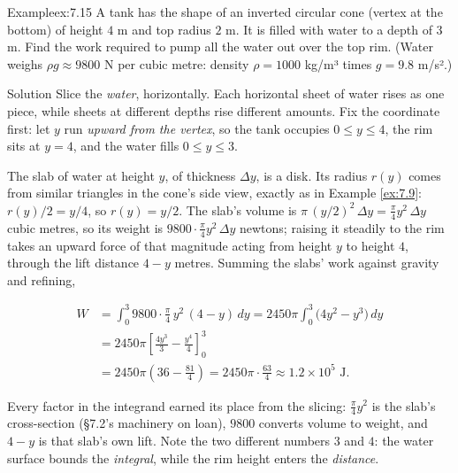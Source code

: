 \documentclass[a4paper,12pt,oneside]{memoir}
\begin{document}
\begin{workedexample}
\begin{envexample}{Example}{ex:7.15}{}
A tank has the shape of an inverted circular cone (vertex at the bottom) of height \(4\) m and top radius \(2\) m. It is filled with water to a depth of \(3\) m. Find the work required to pump all the water out over the top rim. (Water weighs \(\rho g \approx 9800\) N per cubic metre: density \(\rho = 1000\) kg/m³ times \(g = 9.8\) m/s².)
\end{envexample}
\begin{envsolution}{Solution}{}{}
Slice the \emph{water}, horizontally. Each horizontal sheet of water rises as one piece, while sheets at different depths rise different amounts. Fix the coordinate first: let \(y\) run \emph{upward from the vertex}, so the tank occupies \(0 \le y \le 4\), the rim sits at \(y = 4\), and the water fills \(0 \le y \le 3\).

The slab of water at height \(y\), of thickness \(\Delta y\), is a disk. Its radius \(r(y)\) comes from similar triangles in the cone’s side view, exactly as in Example \ref{ex:7.9}: \(r(y)/2 = y/4\), so \(r(y) = y/2\). The slab’s volume is \(\pi\,(y/2)^{2}\,\Delta y = \tfrac{\pi}{4}y^{2}\,\Delta y\) cubic metres, so its weight is \(9800\cdot\tfrac{\pi}{4}y^{2}\,\Delta y\) newtons; raising it steadily to the rim takes an upward force of that magnitude acting from height \(y\) to height \(4\), through the lift distance \(4 - y\) metres. Summing the slabs’ work against gravity and refining,

\[ \begin{aligned}
          W &= \int_{0}^{3} 9800\cdot\frac{\pi}{4}\,y^{2}\,(4 - y)\,dy = 2450\pi \int_{0}^{3} \bigl(4y^{2} - y^{3}\bigr)\,dy \\[2pt]
            &= 2450\pi \left[\frac{4y^{3}}{3} - \frac{y^{4}}{4}\right]_{0}^{3} \\[2pt]
            &= 2450\pi\left(36 - \frac{81}{4}\right) = 2450\pi\cdot\frac{63}{4} \approx 1.2 \times 10^{5} \text{ J}.
        \end{aligned} \]

Every factor in the integrand earned its place from the slicing: \(\tfrac{\pi}{4}y^{2}\) is the slab’s cross-section (§7.2’s machinery on loan), \(9800\) converts volume to weight, and \(4 - y\) is that slab’s own lift. Note the two different numbers \(3\) and \(4\): the water surface bounds the \emph{integral}, while the rim height enters the \emph{distance}. \qedmark
\end{envsolution}
\end{workedexample}
\end{document}

